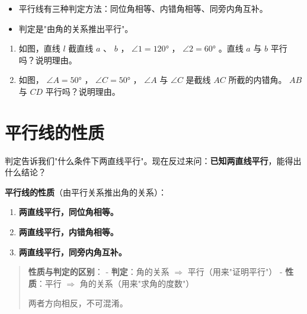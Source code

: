 \begin{keytakeaway}


\begin{itemize}
  \item 平行线有三种判定方法：同位角相等、内错角相等、同旁内角互补。
  \item 判定是"由角的关系推出平行"。
\end{itemize}


\end{keytakeaway}

\begin{practice}


\begin{enumerate}
  \item 如图，直线 $l$ 截直线 $a$ 、 $b$ ， $\angle 1 = 120°$ ， $\angle 2 = 60°$ 。直线 $a$ 与 $b$ 平行吗？说明理由。
  \item 如图， $\angle A = 50°$ ， $\angle C = 50°$ ， $\angle A$ 与 $\angle C$ 是截线 $AC$ 所截的内错角。 $AB$ 与 $CD$ 平行吗？说明理由。
\end{enumerate}


\end{practice}



\section*{平行线的性质}


\begin{explore}


判定告诉我们"什么条件下两直线平行"。现在反过来问：\textbf{已知两直线平行}，能得出什么结论？

\end{explore}

\begin{understand}


\textbf{平行线的性质}（由平行关系推出角的关系）：

\begin{enumerate}
  \item \textbf{两直线平行，同位角相等。}
  \item \textbf{两直线平行，内错角相等。}
  \item \textbf{两直线平行，同旁内角互补。}
\end{enumerate}


\end{understand}

\begin{quote}
\textbf{性质与判定的区别}：
- \textbf{判定}：角的关系 $\Rightarrow$ 平行（用来"证明平行"）
- \textbf{性质}：平行 $\Rightarrow$ 角的关系（用来"求角的度数"）

两者方向相反，不可混淆。
\end{quote}


